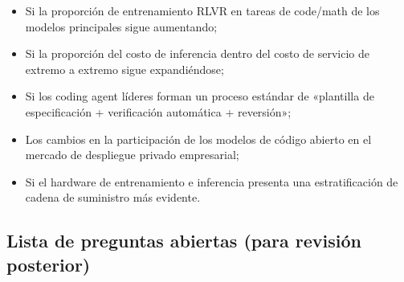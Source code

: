 \documentclass[a4paper]{article}
\begin{document}
\begin{itemize}[leftmargin=1.5em]
    \item Si la proporción de entrenamiento RLVR en tareas de code/math de los modelos principales sigue aumentando;
    \item Si la proporción del costo de inferencia dentro del costo de servicio de extremo a extremo sigue expandiéndose;
    \item Si los coding agent líderes forman un proceso estándar de «plantilla de especificación + verificación automática + reversión»;
    \item Los cambios en la participación de los modelos de código abierto en el mercado de despliegue privado empresarial;
    \item Si el hardware de entrenamiento e inferencia presenta una estratificación de cadena de suministro más evidente.
\end{itemize}

\subsection{Lista de preguntas abiertas (para revisión posterior)}
\end{document}

